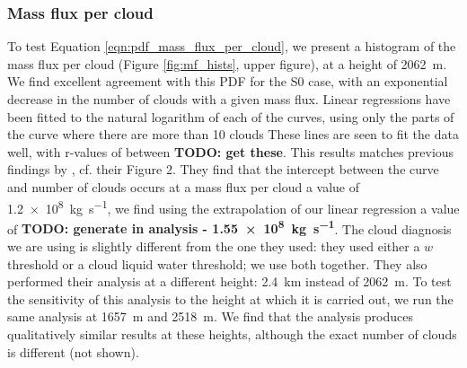 \documentclass[11pt,a4paper]{article}
\newcommand\todo[1]{\textbf{TODO: #1}}
\begin{document}
%
\subsubsection{Mass flux per cloud}
To test Equation \ref{eqn:pdf_mass_flux_per_cloud}, we present a histogram of the mass flux per cloud (Figure \ref{fig:mf_hists}, upper figure), at a height of \SI{2062}{m}. We find excellent agreement with this PDF for the S0 case, with an exponential decrease in the number of clouds with a given mass flux. Linear regressions have been fitted to the natural logarithm of each of the curves, using only the parts of the curve where there are more than 10 clouds These lines are seen to fit the data well, with r-values of between \todo{get these}. This results matches previous findings by \cite{CC2006II}, cf. their Figure 2. They find that the intercept between the curve and number of clouds occurs at a mass flux per cloud a value of \SI{1.2e8}{kg.s^{-1}}, we find using the extrapolation of our linear regression a value of \todo{generate in analysis - \SI{1.55e8}{kg.s^{-1}}}. The cloud diagnosis we are using is slightly different from the one they used: they used either a $w$ threshold or a cloud liquid water threshold; we use both together. They also performed their analysis at a different height: \SI{2.4}{km} instead of \SI{2062}{m}. To test the sensitivity of this analysis to the height at which it is carried out, we run the same analysis at \SI{1657}{m} and \SI{2518}{m}. We find that the analysis produces qualitatively similar results at these heights, although the exact number of clouds is different (not shown).
\end{document}
